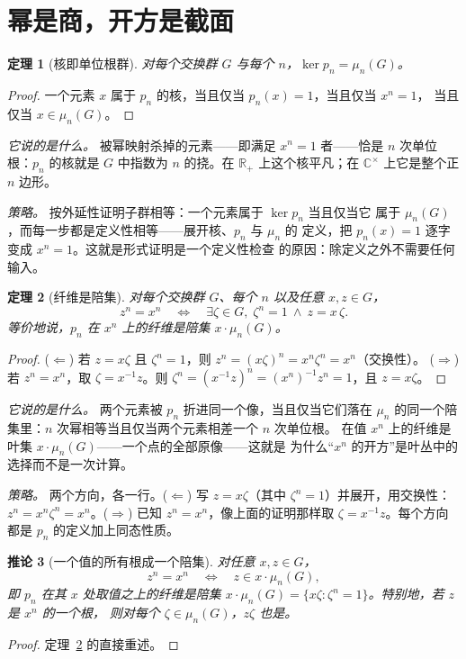 \documentclass[submission,noinfoline]{jsfds}
\newtheorem{theorem}{定理}
\newtheorem{corollary}[theorem]{推论}
\newcommand{\Lean}[1]{}
\begin{document}
\section{幂是商，开方是截面}\label{sec:quotient}

\begin{theorem}[核即单位根群]\label{thm:ker}
对每个交换群 $G$ 与每个 $n$，$\ker p_n=\mu_n(G)$。
\end{theorem}
\begin{proof}
一个元素 $x$ 属于 $p_n$ 的核，当且仅当 $p_n(x)=1$，当且仅当 $x^n=1$，
当且仅当 $x\in\mu_n(G)$。 \Lean{powMap\_ker\_eq\_nRoots}
\end{proof}

\textit{它说的是什么。} 被幂映射杀掉的元素——即满足 $x^n=1$ 者——恰是
$n$ 次单位根：$p_n$ 的核就是 $G$ 中指数为 $n$ 的挠。在 $\mathbb R_+$
上这个核平凡；在 $\mathbb C^\times$ 上它是整个正 $n$ 边形。

\textit{策略。} 按外延性证明子群相等：一个元素属于 $\ker p_n$ 当且仅当它
属于 $\mu_n(G)$，而每一步都是定义性相等——展开核、$p_n$ 与 $\mu_n$ 的
定义，把 $p_n(x)=1$ 逐字变成 $x^n=1$。这就是形式证明是一个定义性检查
\Lean{powMap\_ker\_eq\_nRoots} 的原因：除定义之外不需要任何输入。

\begin{theorem}[纤维是陪集]\label{thm:fiber}
对每个交换群 $G$、每个 $n$ 以及任意 $x,z\in G$，
\[
  z^n=x^n \quad\Longleftrightarrow\quad \exists \zeta\in G,\;
  \zeta^n=1\ \wedge\ z=x\,\zeta .
\]
等价地说，$p_n$ 在 $x^n$ 上的纤维是陪集 $x\cdot\mu_n(G)$。
\end{theorem}
\begin{proof}
($\Leftarrow$) 若 $z=x\zeta$ 且 $\zeta^n=1$，则
$z^n=(x\zeta)^n=x^n\zeta^n=x^n$（交换性）。
($\Rightarrow$) 若 $z^n=x^n$，取 $\zeta=x^{-1}z$。则
$\zeta^n=(x^{-1}z)^n=(x^n)^{-1}z^n=1$，且 $z=x\zeta$。
\Lean{powMap\_fiber\_iff}
\end{proof}

\textit{它说的是什么。} 两个元素被 $p_n$ 折进同一个像，当且仅当它们落在
$\mu_n$ 的同一个陪集里：$n$ 次幂相等当且仅当两个元素相差一个 $n$ 次单位根。
在值 $x^n$ 上的纤维是叶集 $x\cdot\mu_n(G)$——一个点的全部原像——这就是
为什么``$x^n$ 的开方''是叶丛中的选择而不是一次计算。

\textit{策略。} 两个方向，各一行。($\Leftarrow$) 写 $z=x\zeta$（其中
$\zeta^n=1$）并展开，用交换性：$z^n=x^n\zeta^n=x^n$。($\Rightarrow$)
已知 $z^n=x^n$，像上面的证明那样取 $\zeta=x^{-1}z$。每个方向都是 $p_n$
的定义加上同态性质。

\begin{corollary}[一个值的所有根成一个陪集]\label{cor:rootset-coset}
对任意 $x,z\in G$，
\[
  z^n=x^n \quad\Longleftrightarrow\quad z\in x\cdot\mu_n(G),
\]
即 $p_n$ 在其 $x$ 处取值之上的纤维是陪集
$x\cdot\mu_n(G)=\{x\zeta:\zeta^n=1\}$。特别地，若 $z$ 是 $x^n$ 的一个根，
则对每个 $\zeta\in\mu_n(G)$，$z\zeta$ 也是。
\end{corollary}
\begin{proof}
定理~\ref{thm:fiber} 的直接重述。
\end{proof}
\end{document}
